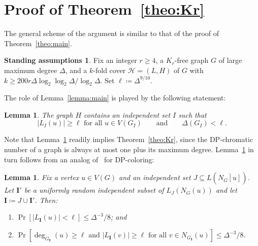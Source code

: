 \documentclass[11pt, reqno, psamsfonts]{amsart}
\newtheorem{lemma}[theo]{Lemma}
\theoremstyle{definition}
\newtheorem*{assum}{Standing assumptions}
\theoremstyle{remark}
\newcommand{\0}{\varnothing}
\renewcommand{\leq}{\leqslant}
\renewcommand{\geq}{\geqslant}
\newcommand{\defeq}{\coloneqq}
\newcommand{\Cov}[1]{\mathscr{#1}}
\renewcommand{\mathbf}[1]{{\bm{#1}}}
\numberwithin{equation}{section}
\begin{document}
	\section{Proof of Theorem~\ref{theo:Kr}}\label{sec:Kr}

	\noindent The general scheme of the argument is similar to that of the proof of Theorem~\ref{theo:main}.
	
	\begin{assum}
		Fix an integer $r \geq 4$, a $K_r$-free graph $G$ of large maximum degree $\Delta$, and a $k$-fold cover $\Cov{H} = (L, H)$ of $G$ with $k \geq 200r\Delta\log_2\log_2\Delta/\log_2\Delta$. Set $\ell \defeq \Delta^{9/10}$.
	\end{assum}
	
	The role of Lemma~\ref{lemma:main} is played by the following statement:
	 
	\begin{lemma}\label{lemma:Kr_main}
		The graph $H$ contains an independent set $I$ such that
			\[|L_I(u)| \geq \ell \text{ for all } u \in V(G_I) \qquad \text{and} \qquad \Delta(G_I) < \ell.
			\]
	\end{lemma}
	
	Note that Lemma~\ref{lemma:Kr_main} readily implies Theorem~\ref{theo:Kr}, since the DP-chromatic number of a graph is always at most one plus its maximum degree. Lemma~\ref{lemma:Kr_main} in turn follows from an analog of~\cite[Lemma~15]{Mol17} for DP-coloring:
	
	\begin{lemma}\label{lemma:Kr_bounds}
		Fix a vertex $u \in V(G)$ and an independent set $J\subseteq L(\overline{N_G[u]})$. Let $\mathbf{I}'$ be a uniformly random independent subset of $L_J(N_G(u))$ and let $\mathbf{I} \defeq J \cup \mathbf{I}'$. Then:
		\begin{enumerate}[label=\normalfont{(\emph{\alph*})}]
			\item\label{item:aKr} $\Pr\left[|L_\mathbf{I}(u)| < \ell\right] \leq \Delta^{-3}/8$; and
			\item\label{item:bKr} $\Pr\left[\deg_{G_\mathbf{I}}(u) \geq \ell \text{ and } |L_\mathbf{I}(v)| \geq \ell \text{ for all } v \in N_{G_\mathbf{I}}(u) \right] \leq \Delta^{-3}/8$.
		\end{enumerate}
	\end{lemma}
	
\end{document}
